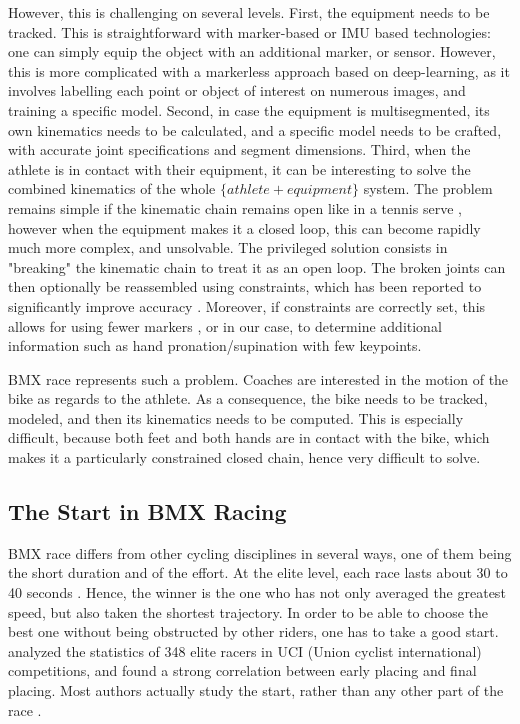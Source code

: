However, this is challenging on several levels. First, the equipment needs to be tracked. This is straightforward with marker-based or IMU based technologies: one can simply equip the object with an additional marker, or sensor. However, this is more complicated with a markerless approach based on deep-learning, as it involves labelling each point or object of interest on numerous images, and training a specific model. Second, in case the equipment is multisegmented, its own kinematics needs to be calculated, and a specific model needs to be crafted, with accurate joint specifications and segment dimensions. Third, when the athlete is in contact with their equipment, it can be interesting to solve the combined kinematics of the whole $\{athlete+equipment\}$ system. The problem remains simple if the kinematic chain remains open like in a tennis serve \cite{Martin2013}, however when the equipment makes it a closed loop, this can become rapidly much more complex, and unsolvable. The privileged solution consists in "breaking" the kinematic chain to treat it as an open loop. The broken joints can then optionally be reassembled using constraints, which has been reported to significantly improve accuracy \cite{Rosenhahn2008,Fohanno2014}. Moreover, if constraints are correctly set, this allows for using fewer markers \cite{Begon2009}, or in our case, to determine additional information such as hand pronation/supination with few keypoints.

BMX race represents such a problem. Coaches are interested in the motion of the bike as regards to the athlete. As a consequence, the bike needs to be tracked, modeled, and then its kinematics needs to be computed. This is especially difficult, because both feet and both hands are in contact with the bike, which makes it a particularly constrained closed chain, hence very difficult to solve. 


\subsection{The Start in BMX Racing}
BMX race differs from other cycling disciplines in several ways, one of them being the short duration and of the effort. At the elite level, each race lasts about 30 to 40 seconds \cite{Cowell2012}. Hence, the winner is the one who has not only averaged the greatest speed, but also taken the shortest trajectory. In order to be able to choose the best one without being obstructed by other riders, one has to take a good start. \cite{Rylands2014} analyzed the statistics of 348 elite racers in UCI (Union cyclist international) competitions, and found a strong correlation between early placing and final placing. Most authors actually study the start, rather than any other part of the race \cite{Zabala2009,Gianikellis2011,Chiementin2012,Kalichova2013,Rylands2014}.

